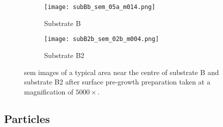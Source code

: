
\begin{figure}[htbp]
    \begin{subfigure}[t]{0.49\textwidth}
        \texttt{[image: subBb\_sem\_05a\_m014.png]}
        \caption{Substrate B}\label{fig:subBb_sem_typical_centre}
    \end{subfigure}%
    \hfill
    \begin{subfigure}[t]{0.49\textwidth}
        \texttt{[image: subB2b\_sem\_02b\_m004.png]}
        \caption{Substrate B2}\label{fig:subB2b_sem_typical_centre}
    \end{subfigure}%
    \caption[\Ac{sem} images of typical areas on substrate B and B2 with surface pre-growth preparation.]{\Acf{sem} images of a typical area near the centre of substrate B and substrate B2 after surface pre-growth preparation taken at a magnification of $5000\times$.}\label{fig:subBb_and_subB2b_sem_typical}
\end{figure}


\subsection{Particles}


